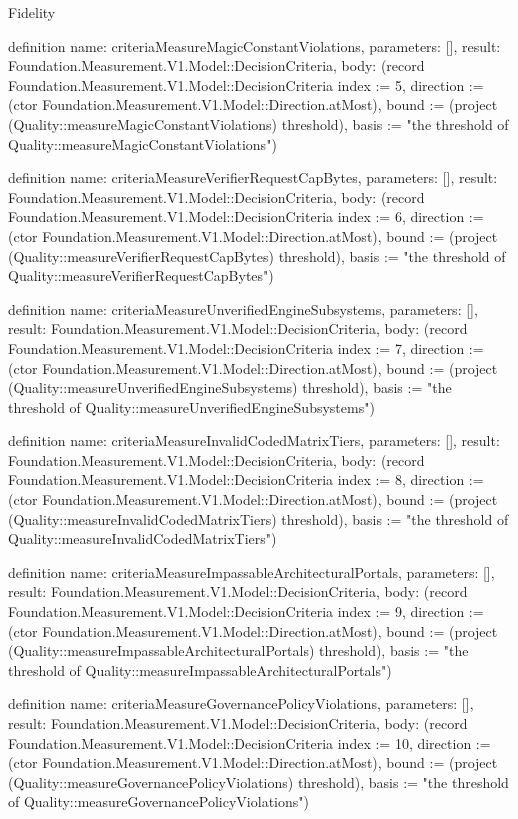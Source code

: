 \begin{lexlean}{Fidelity}
\begin{semanticmodule}
definition{
  name: criteriaMeasureMagicConstantViolations,
  parameters: [],
  result: Foundation.Measurement.V1.Model::DecisionCriteria,
  body: (record Foundation.Measurement.V1.Model::DecisionCriteria {index := 5, direction := (ctor Foundation.Measurement.V1.Model::Direction.atMost), bound := (project (Quality::measureMagicConstantViolations) threshold), basis := "the threshold of Quality::measureMagicConstantViolations"})
}

definition{
  name: criteriaMeasureVerifierRequestCapBytes,
  parameters: [],
  result: Foundation.Measurement.V1.Model::DecisionCriteria,
  body: (record Foundation.Measurement.V1.Model::DecisionCriteria {index := 6, direction := (ctor Foundation.Measurement.V1.Model::Direction.atMost), bound := (project (Quality::measureVerifierRequestCapBytes) threshold), basis := "the threshold of Quality::measureVerifierRequestCapBytes"})
}

definition{
  name: criteriaMeasureUnverifiedEngineSubsystems,
  parameters: [],
  result: Foundation.Measurement.V1.Model::DecisionCriteria,
  body: (record Foundation.Measurement.V1.Model::DecisionCriteria {index := 7, direction := (ctor Foundation.Measurement.V1.Model::Direction.atMost), bound := (project (Quality::measureUnverifiedEngineSubsystems) threshold), basis := "the threshold of Quality::measureUnverifiedEngineSubsystems"})
}

definition{
  name: criteriaMeasureInvalidCodedMatrixTiers,
  parameters: [],
  result: Foundation.Measurement.V1.Model::DecisionCriteria,
  body: (record Foundation.Measurement.V1.Model::DecisionCriteria {index := 8, direction := (ctor Foundation.Measurement.V1.Model::Direction.atMost), bound := (project (Quality::measureInvalidCodedMatrixTiers) threshold), basis := "the threshold of Quality::measureInvalidCodedMatrixTiers"})
}

definition{
  name: criteriaMeasureImpassableArchitecturalPortals,
  parameters: [],
  result: Foundation.Measurement.V1.Model::DecisionCriteria,
  body: (record Foundation.Measurement.V1.Model::DecisionCriteria {index := 9, direction := (ctor Foundation.Measurement.V1.Model::Direction.atMost), bound := (project (Quality::measureImpassableArchitecturalPortals) threshold), basis := "the threshold of Quality::measureImpassableArchitecturalPortals"})
}

definition{
  name: criteriaMeasureGovernancePolicyViolations,
  parameters: [],
  result: Foundation.Measurement.V1.Model::DecisionCriteria,
  body: (record Foundation.Measurement.V1.Model::DecisionCriteria {index := 10, direction := (ctor Foundation.Measurement.V1.Model::Direction.atMost), bound := (project (Quality::measureGovernancePolicyViolations) threshold), basis := "the threshold of Quality::measureGovernancePolicyViolations"})
}


\end{semanticmodule}
\end{lexlean}
